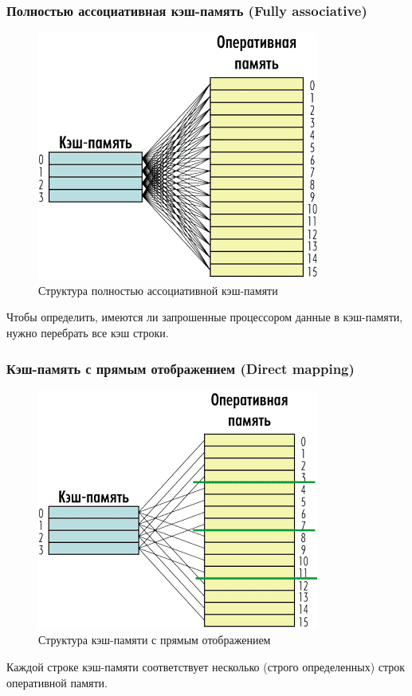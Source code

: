 \documentclass{beamer}
\begin{document}
\begin{frame}
\frametitle{Полностью ассоциативная кэш-память (Fully associative)}

\begin{figure}
\includegraphics[scale=0.53]{Pic_3}
\caption{Структура полностью ассоциативной кэш-памяти}
\end{figure}

Чтобы определить, имеются ли запрошенные процессором данные в кэш-памяти, нужно перебрать все кэш строки.

\end{frame}


\begin{frame}
\frametitle{Кэш-память с прямым отображением (Direct mapping)}

\begin{figure}
\includegraphics[scale=0.55]{Pic_4}
\caption{Структура кэш-памяти с прямым отображением}
\end{figure}

Каждой строке кэш-памяти соответствует несколько (строго определенных) строк оперативной памяти.

\end{frame}
\end{document}
